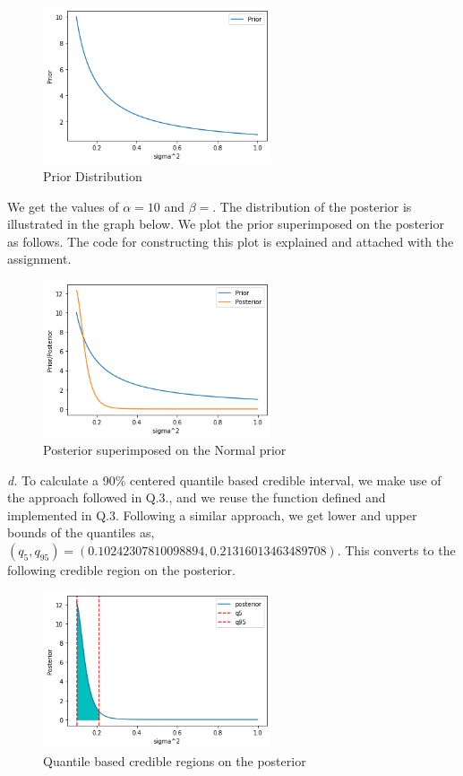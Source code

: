 \documentclass[11pt]{article}
\begin{document}
\begin{figure}[H]
  \centering
  \includegraphics[width = 0.6\textwidth]{q6a.png}
  \caption{Prior Distribution}
\end{figure}
\noindent We get the values of $\alpha = 10$ and $\beta = $. The distribution of the posterior is illustrated in the graph below. We plot the prior superimposed on the posterior as follows. The code for constructing this plot is explained and attached with the assignment.
\begin{figure}[H]
  \centering
  \includegraphics[width = 0.6\textwidth]{q6b.png}
  \caption{Posterior superimposed on the Normal prior}
\end{figure}
\noindent \emph{d.} To calculate a 90\% centered quantile based credible interval, we make use of the approach followed in Q.3., and we reuse the function defined and implemented in Q.3. Following a similar approach, we get lower and upper bounds of the quantiles as, $(q_{5}, q_{95}) = (0.10242307810098894, 0.21316013463489708)$. This converts to the following credible region on the posterior.
\begin{figure}[H]
  \centering
  \includegraphics[width = 0.6\textwidth]{q6d.png}
  \caption{Quantile based credible regions on the posterior}
\end{figure}
\end{document}
